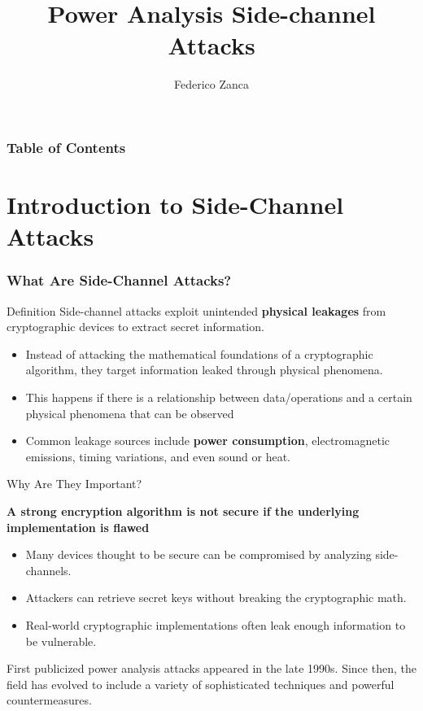 \documentclass{beamer}
\title[Power Analysis Side-channel Attacks] %
{Power Analysis Side-channel Attacks}
\subtitle{}
\author[Federico Zanca] %
{Federico Zanca}
\institute[] %
{
  Computer Science and Engineering\\
  Politecnico di Milano
}
\date[2025] %
{}
\begin{document}
\frame{\titlepage}


\begin{frame}
\frametitle{Table of Contents}
\tableofcontents
\end{frame}




\section{Introduction to Side-Channel Attacks}

\begin{frame}
    \frametitle{What Are Side-Channel Attacks?}

    \begin{block}{Definition}
        Side-channel attacks exploit unintended \textbf{physical leakages} from cryptographic devices to extract secret information.
        \begin{itemize}
            \item Instead of attacking the mathematical foundations of a cryptographic algorithm, they target information leaked through physical phenomena.
            \item This happens if there is a relationship between data/operations and a certain physical phenomena that can be observed
            \item Common leakage sources include \textbf{power consumption}, electromagnetic emissions, timing variations, and even sound or heat.
        \end{itemize}
    \end{block} 
\end{frame}

\begin{frame}{Why Are They Important?}
    \begin{block}{}
\textbf{A strong encryption algorithm is not secure if the underlying implementation is flawed
}        \begin{itemize}
            \item Many devices thought to be secure can be compromised by analyzing side-channels.
            \item Attackers can retrieve secret keys without breaking the cryptographic math.
            \item Real-world cryptographic implementations often leak enough information to be vulnerable.
        \end{itemize}
    \end{block}
    
First publicized power analysis attacks appeared in the late 1990s. \newline
Since then, the field has evolved to include a variety of sophisticated techniques and powerful countermeasures.
\end{frame}









\end{document}
